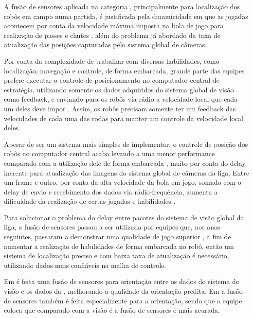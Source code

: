 \documentclass[acronym, symbols, table]{fei}
\begin{document}
				A fusão de sensores aplicada na categoria , principalmente para localização dos robôs em campo numa partida, é justificada pela dinamicidade em que as jogadas acontecem por conta da velocidade máxima imposta na bola de jogo para realização de passes e chutes \cite{rules}, além do problema já abordado da taxa de atualização das posições capturadas pelo sistema global de câmeras.
				
				Por conta da complexidade de trabalhar com diversas habilidades, como localização, navegação e controle, de forma embarcada, grande parte das equipes prefere executar o controle de posicionamento no computador central de estratégia, utilizando somente os dados adquiridos do sistema global de visão como feedback, e enviando para os robôs via-rádio a velocidade local que cada um deles deve impor \cite{ubc_thunderbots_2015, immortals_2023}. Assim, os robôs precisam somente ter um feedback das velocidades de cada uma das rodas para manter um controle da velocidade local deles.
				
				Apesar de ser um sistema mais simples de implementar, o controle de posição dos robôs no computador central acaba levando a uma menor performance comparado com a utilização dele de forma embarcada \cite{ubc_thunderbots_2015}, muito por conta do delay inerente para atualização das imagens do sistema global de câmeras da liga. Entre um frame e outro, por conta da alta velocidade da bola em jogo, somado com o delay de envio e recebimento dos dados via rádio-frequência, aumenta a dificuldade da realização de certas jogadas e habilidades \cite{immortals_2023}.
				
				Para solucionar o problema do delay entre pacotes do sistema de visão global da liga, a fusão de sensores passou a ser utilizada por equipes que, nos anos seguintes, passaram a demonstrar uma qualidade de jogo superior \cite{zjunlict_2018, tigers_2013, ubc_thunderbots_2015, ubc_thunderbots_2017, immortals_2023, parsian_2015}, a fim de aumentar a realização de habilidades de forma embarcada no robô, então um sistema de localização preciso e com baixa taxa de atualização é necessário, utilizando dados mais confiáveis na malha de controle.
				
				Em \textcite{immortals_2023} é feita uma fusão de sensores para orientação entre os dados do sistema de visão e os dados da , melhorando a qualidade da orientação predita. Em \textcite{parsian_2019} a fusão de sensores também é feita especialmente para a orientação, sendo que a equipe coloca que comparado com a visão é a fusão de sensores é mais acurada.
				
\end{document}
